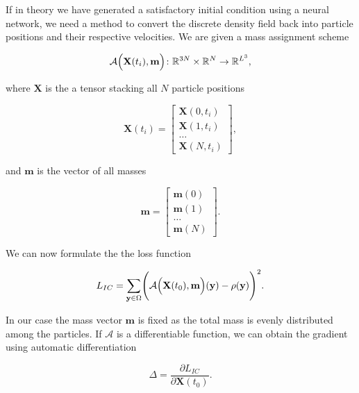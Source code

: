 If in theory we have generated a satisfactory initial condition using a neural network, we need a method to convert the discrete density field back into particle positions and their respective velocities.
We are given a mass assignment scheme 

\begin{equation}
    \mathcal{A}\Bigl(\mathbf{X}(t_i), \mathbf{m}\Bigr) \colon \mathbb{R}^{3N} \times \mathbb{R}^{N} \rightarrow \mathbb{R}^{L^3},
\end{equation}

where $\mathbf{X}$ is the a tensor stacking all $N$ particle positions

\begin{equation}
    \mathbf{X}(t_i) = \begin{bmatrix}
        \mathbf{X}(0, t_i) \\
        \mathbf{X}(1, t_i) \\
        \dots  \\
        \mathbf{X}(N, t_i)
    \end{bmatrix},
\end{equation}

and $\mathbf{m}$ is the vector of all masses

\begin{equation}
    \mathbf{m}= \begin{bmatrix}
        \mathbf{m}(0) \\
        \mathbf{m}(1) \\
        \dots  \\
        \mathbf{m}(N)
    \end{bmatrix}.
\end{equation}

We can now formulate the the loss function

\begin{equation}
    L_{IC} = \sum_{\mathbf{y} \in \Omega} \Biggl(\mathcal{A}\Bigl(\mathbf{X}(t_0), \mathbf{m}\Bigr)(\mathbf{y}) - \rho(\mathbf{y})\Biggr)^2.
\end{equation}

In our case the mass vector $\mathbf{m}$ is fixed as the total mass is evenly distributed among the particles. If $\mathcal{A}$ is a differentiable function, we can obtain the gradient using automatic differentiation 

\begin{equation}
    \Delta = \frac{\partial L_{IC}}{\partial \mathbf{X}(t_0)}.
\end{equation}

